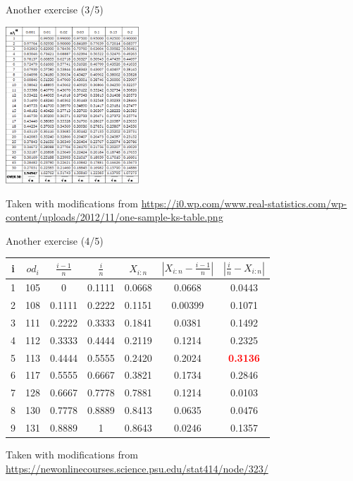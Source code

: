 \documentclass{beamer}
\begin{document}
\begin{frame}
{\centerline{Another exercise (3/5)}}\label{S:TableKS}

\begin{center}
\includegraphics[width=5cm]{P2023.AIBCCSS.InferenceAndLogisticRegression/one-sample-ks-table.png}
\end{center}

\begin{center}
\tiny{Taken with modifications from \url{https://i0.wp.com/www.real-statistics.com/wp-content/uploads/2012/11/one-sample-ks-table.png}}
\end{center}
\end{frame}


\begin{frame}
{\centerline{Another exercise (4/5)}} \label{S:ComputationExercise}

\begin{center}
\begin{tabular}{|c|c|c|c|c|c|c|}
	\toprule
	i & $od_i$ & $\frac{i-1}{n}$ & $\frac{i}{n}$ & $X_{i:n}$ & $|X_{i:n} - \frac{i-1}{n} |$ & $|\frac{i}{n} - X_{i:n}|$\\
	\midrule
	1 & 105 & 0 & 0.1111 & 0.0668 & 0.0668 & 0.0443\\
	\midrule
	2 & 108 & 0.1111 & 0.2222 & 0.1151 & 0.00399 & 0.1071\\
	\midrule
	3 & 111 & 0.2222 & 0.3333 & 0.1841 & 0.0381 & 0.1492\\
	\midrule
	4 & 112 & 0.3333 & 0.4444 & 0.2119 & 0.1214 & 0.2325\\
	\midrule
	5 & 113 & 0.4444 & 0.5555 & 0.2420 & 0.2024 & \textcolor{red}{\bf 0.3136}\\
	\midrule
	6 & 117 & 0.5555 & 0.6667 & 0.3821 & 0.1734 & 0.2846\\
	\midrule
	7 & 128 & 0.6667 & 0.7778 & 0.7881 & 0.1214 & 0.0103 \\
	\midrule
	8 & 130 & 0.7778 & 0.8889 & 0.8413 & 0.0635 & 0.0476\\
	\midrule
	9 & 131 & 0.8889 & 1 & 0.8643 & 0.0246 & 0.1357\\
	\bottomrule
\end{tabular}
\end{center}

\begin{center}
\tiny{Taken with modifications from \url{https://newonlinecourses.science.psu.edu/stat414/node/323/}}
\end{center}
\end{frame}
\end{document}
